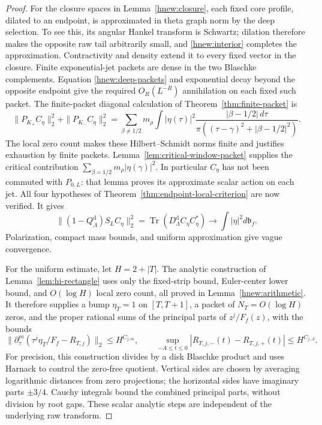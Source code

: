 \begin{proof}
For the closure spaces in Lemma~\ref{hnew:closure}, each fixed
core profile, dilated to an endpoint, is approximated in theta
graph norm by the deep selection.  To see this, its angular
Hankel transform is Schwartz; dilation therefore makes the
opposite raw tail arbitrarily small, and
\eqref{hnew:interior} completes the approximation.
Contractivity and density extend it to every fixed vector in
the closure.  Finite exponential-jet packets are dense in the
two Blaschke complements.  Equation \eqref{hnew:deep-packets}
and exponential decay beyond the opposite endpoint give the
required $O_R(L^{-R})$ annihilation on each fixed such packet.
The finite-packet diagonal calculation of
Theorem~\ref{thm:finite-packet} is
\[
 \|P_{K_+}C_\eta\|_2^2+\|P_{K_-}C_\eta\|_2^2
 =\sum_{\beta\ne1/2}m_\rho
 \int|\eta(\tau)|^2
 \frac{|\beta-1/2|\,d\tau}
 {\pi((\tau-\gamma)^2+|\beta-1/2|^2)}.
\]
The local zero count makes these Hilbert--Schmidt norms finite
and justifies exhaustion by finite packets.
Lemma~\ref{lem:critical-window-packet} supplies the critical
contribution $\sum_{\beta=1/2}m_\rho|\eta(\gamma)|^2$.
In particular $C_\eta$ has not been commuted with $P_{0,L}$:
that lemma proves its approximate scalar action on each jet.
All four hypotheses of
Theorem~\ref{thm:endpoint-local-criterion} are now verified.
It gives
\[
 \|(1-Q_\Lambda^{\mathrm d})S_LC_\eta\|_2^2
  =\operatorname{Tr}(D_\Lambda^{\mathrm d}C_\eta C_\eta^*)
       \longrightarrow\int|\eta|^2d\mathfrak b_f.
\]
Polarization, compact mass bounds, and uniform approximation
give vague convergence.

For the uniform estimate, let $H=2+|T|$.
The analytic construction of Lemma~\ref{lem:hi-rectangle}
uses only the fixed-strip bound, Euler-center lower bound,
and $O(\log H)$ local zero count, all proved in
Lemma~\ref{hnew:arithmetic}.  It therefore supplies a bump
$\eta_T=1$ on $[T,T+1]$, a packet of $N_T=O(\log H)$ zeros,
and the proper rational sums of the principal parts of
$z^j/F_f(z)$, with the bounds
\[
 \|\partial_\tau^m(\tau^j\eta_T/F_f-R_{T,j})\|_2
       \le H^{C_{j,m}},\qquad
 \sup_{-A\le t\le0}|R_{T,j,-}(t)-R_{T,j,+}(t)|
       \le H^{C_{j,A}}.
\]
For precision, this construction divides by a disk Blaschke
product and uses Harnack to control the zero-free quotient.
Vertical sides are chosen by averaging logarithmic distances
from zero projections; the horizontal sides have imaginary
parts $\pm3/4$.  Cauchy integrals bound the combined principal
parts, without division by root gaps.  These scalar analytic
steps are independent of the underlying raw transform.


\end{proof}
